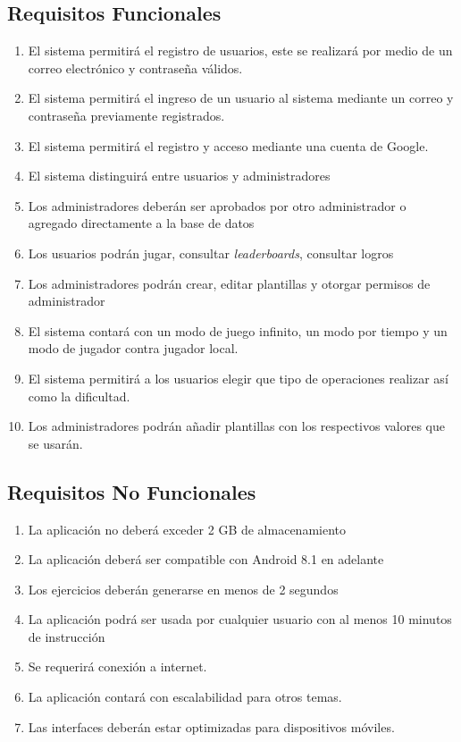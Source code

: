 \documentclass{article}
\begin{document}
\subsection{Requisitos Funcionales}
\begin{enumerate}
\item {El sistema permitirá el registro de usuarios, este se realizará por medio de un correo electrónico y contraseña válidos.}
\item{El sistema permitirá el ingreso de un usuario al sistema mediante un correo y contraseña  previamente registrados.}
\item {El sistema permitirá el registro y acceso mediante una cuenta de Google.}
\item{El sistema distinguirá entre usuarios y administradores}
\item{Los administradores deberán ser aprobados por otro administrador o agregado directamente a la base de datos}
\item{Los usuarios podrán jugar, consultar \emph{leaderboards}, consultar logros}
\item{Los administradores podrán crear, editar plantillas y otorgar permisos de administrador}
\item {El sistema contará con un modo de juego infinito, un modo por tiempo y un modo de jugador contra jugador local.}
\item{El sistema permitirá a los usuarios elegir que tipo de operaciones realizar así como la dificultad.}
\item{Los administradores podrán añadir plantillas con los respectivos valores que se usarán.}
\end{enumerate}
\subsection{Requisitos No Funcionales}
\begin{enumerate}
\item {La aplicación no deberá exceder 2 GB de almacenamiento}
\item {La aplicación deberá ser compatible con Android 8.1 en adelante}
\item {Los ejercicios deberán generarse en menos de 2 segundos}
\item {La aplicación podrá ser usada por cualquier usuario con al menos 10 minutos de instrucción}
\item {Se requerirá conexión a internet.}
\item {La aplicación contará con escalabilidad para otros temas.}
\item {Las interfaces deberán estar optimizadas para dispositivos móviles.}
\end{enumerate}
\end{document}
